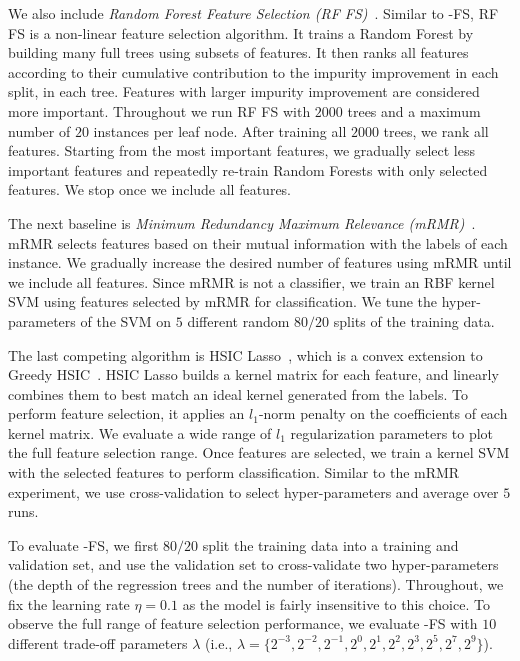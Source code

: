 We also include \emph{Random Forest Feature Selection (RF FS)}~\citep{trevor2009elements}. Similar to \name{}-FS, RF FS is a non-linear feature selection algorithm. It trains a Random Forest by building many full trees using subsets of features. It then ranks all features according to their cumulative contribution to the impurity improvement in each split, in each tree. Features with larger impurity improvement are considered more important. Throughout we run RF FS with $2000$ trees and a maximum number of $20$ instances per leaf node. After training all $2000$ trees, we rank all features. Starting from the most important features, we gradually select less important features and repeatedly re-train Random Forests with only selected features. We stop once we include all features.

The next baseline is \emph{Minimum Redundancy Maximum Relevance (mRMR)}~\citep{peng2005feature}. mRMR selects features based on their mutual information with the labels of each instance. We gradually increase the desired number of features using mRMR until we include all features. Since mRMR is not a classifier, we train an RBF kernel SVM using features selected by mRMR for classification. We tune the hyper-parameters of the SVM on $5$ different random $80/20$ splits of the training data. 

The last competing algorithm is HSIC Lasso~\citep{yamada2012high}, which is a convex extension to Greedy HSIC~\citep{song2012feature}. HSIC Lasso builds a kernel matrix for each feature, and linearly combines them to best match an ideal kernel generated from the labels. To perform feature selection, it applies an $l_1$-norm penalty on the coefficients of each kernel matrix. We evaluate a wide range of $l_1$ regularization parameters to plot the full feature selection range. Once features are selected, we train a kernel SVM with the selected features to perform classification. Similar to the mRMR experiment, we use cross-validation to select hyper-parameters and average over $5$ runs.

To evaluate \name{}-FS, we first $80/20$ split the training data into a training and validation set, and use the validation set to cross-validate two hyper-parameters (the depth of the regression trees and the number of iterations). Throughout, we fix the learning rate $\eta = 0.1$ as the model is fairly insensitive to this choice. To observe the full range of feature selection performance, we evaluate \name{}-FS with $10$ different trade-off parameters $\lambda$ (i.e., $\lambda = \{2^{-3},2^{-2},2^{-1},2^0,2^1,2^2,2^{3},2^{5},2^7,2^9\}$).

